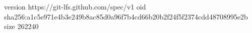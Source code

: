 version https://git-lfs.github.com/spec/v1
oid sha256:a1c5e971e4b3e249b8ac85d0a96f7b4cd66b20b2f24f5f2374cdd48708995e2b
size 262240
